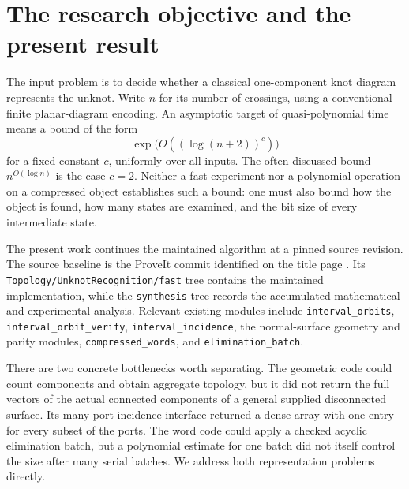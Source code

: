 \documentclass[11pt,a4paper]{article}
\theoremstyle{definition}
\theoremstyle{remark}
\newcommand{\code}[1]{\texttt{#1}}
\begin{document}
\section{The research objective and the present result}
\label{sec:objective}

The input problem is to decide whether a classical one-component knot
diagram represents the unknot. Write $n$ for its number of crossings,
using a conventional finite planar-diagram encoding. An asymptotic target
of quasi-polynomial time means a bound of the form
\[
       \exp\bigl(O((\log(n+2))^c)\bigr)
\]
for a fixed constant $c$, uniformly over all inputs. The often discussed
bound $n^{O(\log n)}$ is the case $c=2$. Neither a fast experiment nor a
polynomial operation on a compressed object establishes such a bound:
one must also bound how the object is found, how many states are examined,
and the bit size of every intermediate state.

The present work continues the maintained algorithm at a pinned source
revision. The source baseline is the
ProveIt commit identified on the title page \cite{proveit2026}. Its
\code{Topology/UnknotRecognition/fast} tree contains the maintained
implementation, while the \code{synthesis} tree records the accumulated
mathematical and experimental analysis. Relevant existing modules include
\code{interval\_orbits}, \code{interval\_orbit\_verify},
\code{interval\_incidence}, the normal-surface geometry and parity
modules, \code{compressed\_words}, and \code{elimination\_batch}.

There are two concrete bottlenecks worth separating. The geometric code
could count components and obtain aggregate topology, but it did not
return the full vectors of the actual connected components of a general
supplied disconnected surface. Its many-port incidence interface returned
a dense array with one entry for every subset of the ports. The word code
could apply a checked acyclic elimination batch, but a polynomial estimate
for one batch did not itself control the size after many serial batches.
We address both representation problems directly.
\end{document}
